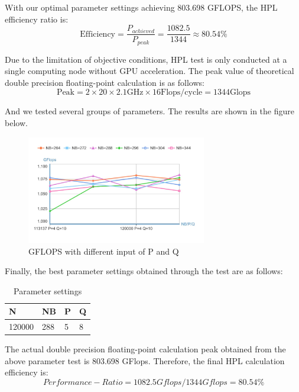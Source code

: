 \documentclass[a4paper,12pt]{article}
\begin{document}
With our optimal parameter settings achieving 803.698 GFLOPS, the HPL efficiency ratio is:
\begin{equation}
    \text{Efficiency} = \frac{P_{achieved}}{P_{peak}} = \frac{1082.5}{1344} \approx 80.54\%
\end{equation}

Due to the limitation of objective conditions, HPL test is only conducted at a single computing node without GPU acceleration. The peak value of theoretical double precision floating-point calculation is as follows:
\begin{equation*}
\text{Peak} = 2 \times 20 \times 2.1\text{GHz} \times 16\text{Flops/cycle} = 1344\text{Glops}
\end{equation*}

And we tested several groups of parameters. The results are shown in the figure below.

\begin{figure}[H]
    \centering
    \includegraphics[width=0.7\textwidth]{GFLOPS_PQ_NB.png}
    \caption{GFLOPS with different input of P and Q}
    \label{fig:gflops_pq_nb}
\end{figure}

Finally, the best parameter settings obtained through the test are as follows:
\begin{table}[H]
\centering
\caption{Parameter settings}
\vspace{0.5cm}
\begin{tabular}{llll}
\toprule
N & NB & P & Q \\
\midrule
120000 & 288 & 5 & 8 \\
\bottomrule
\end{tabular}
\end{table}

The actual double precision floating-point calculation peak obtained from the above parameter test is 803.698 GFlops. Therefore, the final HPL calculation efficiency is:
\begin{equation*}
Performance-Ratio = 1082.5Gflops/1344Gflops = 80.54\%
\end{equation*}
\end{document}
